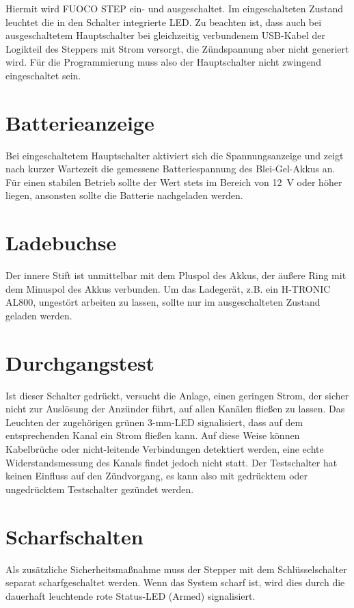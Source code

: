 \documentclass[paper=a4, open=any]{scrbook}
\begin{document}
			Hiermit wird FUOCO STEP ein- und ausgeschaltet. Im eingeschalteten Zustand leuchtet die in den Schalter integrierte LED. Zu beachten ist, dass auch bei ausgeschaltetem Hauptschalter bei gleichzeitig verbundenem USB-Kabel der Logikteil des Steppers mit Strom versorgt, die Zündspannung aber nicht generiert wird. Für die Programmierung muss also der Hauptschalter nicht zwingend eingeschaltet sein.

		\section{Batterieanzeige}

			Bei eingeschaltetem Hauptschalter aktiviert sich die Spannungsanzeige und zeigt nach kurzer Wartezeit die gemessene Batteriespannung des Blei-Gel-Akkus an. Für einen stabilen Betrieb sollte der Wert stets im Bereich von \SI{12}{\volt} oder höher liegen, ansonsten sollte die Batterie nachgeladen werden.

		\section{Ladebuchse}

			Der innere Stift ist unmittelbar mit dem Pluspol des Akkus, der äußere Ring mit dem Minuspol des Akkus verbunden. Um das Ladegerät, z.B. ein H-TRONIC AL800, ungestört arbeiten zu lassen, sollte nur im ausgeschalteten Zustand geladen werden.

		\section{Durchgangstest}

			Ist dieser Schalter gedrückt, versucht die Anlage, einen geringen Strom, der sicher nicht zur Auslösung der Anzünder führt, auf allen Kanälen fließen zu lassen. Das Leuchten der zugehörigen grünen 3-mm-LED signalisiert, dass auf dem entsprechenden Kanal ein Strom fließen kann. Auf diese Weise können Kabelbrüche oder nicht-leitende Verbindungen detektiert werden, eine echte Widerstandsmessung des Kanals findet jedoch nicht statt. Der Testschalter hat keinen Einfluss auf den Zündvorgang, es kann also mit gedrücktem oder ungedrücktem Testschalter gezündet werden.

		\section{Scharfschalten}

			Als zusätzliche Sicherheitsmaßnahme muss der Stepper mit dem Schlüsselschalter separat scharfgeschaltet werden. Wenn das System scharf ist, wird dies durch die dauerhaft leuchtende rote Status-LED (Armed) signalisiert.
\end{document}
